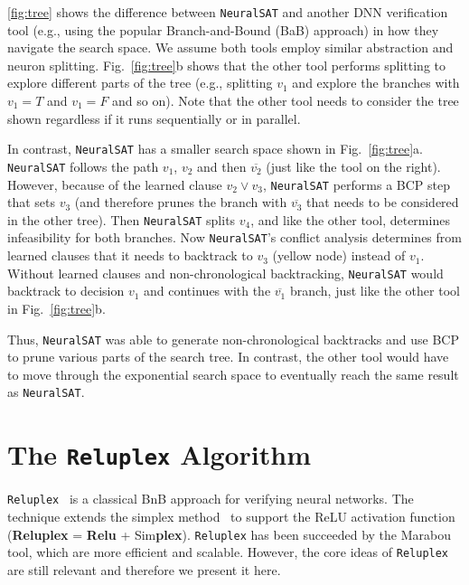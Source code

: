 \documentclass[oneside,11pt,dvipsnames]{book}
\numberwithin{equation}{section}
\theoremstyle{definition}
\theoremstyle{remark}
\newcommand{\tvn}[1]{\iftoggle{usecomment}{{\color{red}{[TVN]: #1}}}{}}
\newcommand{\hd}[1]{\iftoggle{usecomment}{{\color{blue}{[HD]: #1}}}{}}
\newcommand{\reluplex}{\texttt{Reluplex}}
\newcommand{\tool}{\texttt{NeuralSAT}}
\begin{document}

\autoref{fig:tree} shows the difference between \tool{} and another DNN verification tool (e.g., using the popular Branch-and-Bound (BaB) approach) in how they navigate the search space.  We assume both tools employ similar abstraction and neuron splitting.
Fig.~\ref{fig:tree}b shows that the other tool performs splitting to explore different parts of the tree (e.g., splitting $v_1$ and explore the branches with $v_1=T$ and $v_1=F$ and so on). Note that the other tool needs to consider the tree shown regardless if it runs sequentially or in parallel.

In contrast, \tool{} has a smaller search space shown in Fig.~\ref{fig:tree}a.
\tool{} follows the path $v_1$, $v_2$ and then $\overline{v_2}$ (just like the tool on the right).
However, because of the learned clause $v_2\lor v_3$, \tool{} performs a BCP step that sets $v_3$ (and therefore prunes the branch with $\overline{v_3}$ that needs to be considered in the other tree).
Then \tool{} splits $v_4$, and like the other tool, determines infeasibility for both branches. Now \tool{}'s conflict analysis determines from learned clauses that it needs to backtrack to $v_3$ (yellow node) instead of $v_1$.  Without learned clauses and non-chronological backtracking, \tool{} would backtrack to decision $v_1$ and continues with the $\overline{v_1}$ branch, just like the other tool in Fig.~\ref{fig:tree}b.

Thus, \tool{} was able to generate non-chronological backtracks and use BCP to prune various parts of the search tree.  In contrast, the other tool would have to move through the exponential search space to eventually reach the same result as \tool{}.




\chapter{The \reluplex{} Algorithm}\label{chap:reluplex}

\reluplex{}~\cite{katz2017reluplex} is a classical BnB approach for verifying neural networks. The technique extends the simplex method~\cite{nelder1965simplex} to support the ReLU activation function (\textbf{Reluplex} = \textbf{Relu} + Sim\textbf{plex}). \reluplex{} has been succeeded by the Marabou~\cite{katz2019marabou} tool, which are more efficient and scalable. However, the core ideas of \reluplex{} are still relevant and therefore we present it here.
\end{document}
